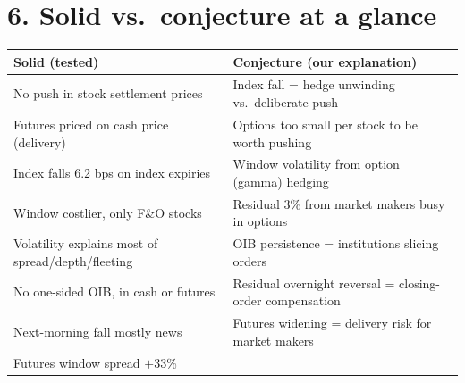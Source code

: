 \documentclass[11pt]{article}
\begin{document}
\section*{6. Solid vs.\ conjecture at a glance}
\begin{center}
\small
\begin{tabular}{p{7.2cm}p{8.4cm}}
\toprule
Solid (tested) & Conjecture (our explanation) \\
\midrule
No push in stock settlement prices & Index fall = hedge unwinding vs.\ deliberate push \\
Futures priced on cash price (delivery) & Options too small per stock to be worth pushing \\
Index falls 6.2 bps on index expiries & Window volatility from option (gamma) hedging \\
Window costlier, only F\&O stocks & Residual 3\% from market makers busy in options \\
Volatility explains most of spread/depth/fleeting & OIB persistence = institutions slicing orders \\
No one-sided OIB, in cash or futures & Residual overnight reversal = closing-order compensation \\
Next-morning fall mostly news & Futures widening = delivery risk for market makers \\
Futures window spread $+33$\% \\
\bottomrule
\end{tabular}
\end{center}
\end{document}

